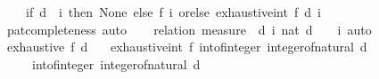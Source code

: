\begin{isabellebody}
\ \ \ \ {\isacharparenleft}{\kern0pt}if\ d\ {\isacharless}{\kern0pt}\ i\ then\ None\ else\ {\isacharparenleft}{\kern0pt}f\ i\ orelse\ exhaustive{\isacharunderscore}{\kern0pt}int{\isacharprime}{\kern0pt}\ f\ d\ {\isacharparenleft}{\kern0pt}i\ {\isacharplus}{\kern0pt}\ {}{\isacharparenright}{\kern0pt}{\isacharparenright}{\kern0pt}{\isacharparenright}{\kern0pt}{\isachardoublequoteclose}\isanewline
%
\isadelimproof
%
\endisadelimproof
%
\isatagproof
{}\isamarkupfalse%
\ pat{\isacharunderscore}{\kern0pt}completeness\ auto%
\endisatagproof
{\isafoldproof}%
%
\isadelimproof
\isanewline
%
\endisadelimproof
\isanewline
{}\isamarkupfalse%
\isanewline
%
\isadelimproof
\ \ %
\endisadelimproof
%
\isatagproof
{}\isamarkupfalse%
\ {\isacharparenleft}{\kern0pt}relation\ {\isachardoublequoteopen}measure\ {\isacharparenleft}{\kern0pt}{\isasymlambda}{\isacharparenleft}{\kern0pt}{\isacharunderscore}{\kern0pt}{\isacharcomma}{\kern0pt}\ d{\isacharcomma}{\kern0pt}\ i{\isacharparenright}{\kern0pt}{\isachardot}{\kern0pt}\ nat\ {\isacharparenleft}{\kern0pt}d\ {\isacharplus}{\kern0pt}\ {}\ {\isacharminus}{\kern0pt}\ i{\isacharparenright}{\kern0pt}{\isacharparenright}{\kern0pt}{\isachardoublequoteclose}{\isacharparenright}{\kern0pt}\ auto%
\endisatagproof
{\isafoldproof}%
%
\isadelimproof
\isanewline
%
\endisadelimproof
\isanewline
{}\isamarkupfalse%
\ {\isachardoublequoteopen}exhaustive\ f\ d\ {\isacharequal}{\kern0pt}\isanewline
\ \ exhaustive{\isacharunderscore}{\kern0pt}int{\isacharprime}{\kern0pt}\ f\ {\isacharparenleft}{\kern0pt}int{\isacharunderscore}{\kern0pt}of{\isacharunderscore}{\kern0pt}integer\ {\isacharparenleft}{\kern0pt}integer{\isacharunderscore}{\kern0pt}of{\isacharunderscore}{\kern0pt}natural\ d{\isacharparenright}{\kern0pt}{\isacharparenright}{\kern0pt}\isanewline
\ \ \ \ {\isacharparenleft}{\kern0pt}{\isacharminus}{\kern0pt}\ {\isacharparenleft}{\kern0pt}int{\isacharunderscore}{\kern0pt}of{\isacharunderscore}{\kern0pt}integer\ {\isacharparenleft}{\kern0pt}integer{\isacharunderscore}{\kern0pt}of{\isacharunderscore}{\kern0pt}natural\ d{\isacharparenright}{\kern0pt}{\isacharparenright}{\kern0pt}{\isacharparenright}{\kern0pt}{\isachardoublequoteclose}\isanewline
\isanewline
{}\isamarkupfalse%
%
\isadelimproof
\ %
\endisadelimproof
%
\isatagproof
\isacommand{{\isachardot}{\kern0pt}{\isachardot}{\kern0pt}}\isamarkupfalse%
%
\endisatagproof
{\isafoldproof}%
%
\isadelimproof
%
\endisadelimproof
\isanewline
\isanewline
{}\isamarkupfalse%
\isanewline

\end{isabellebody}
